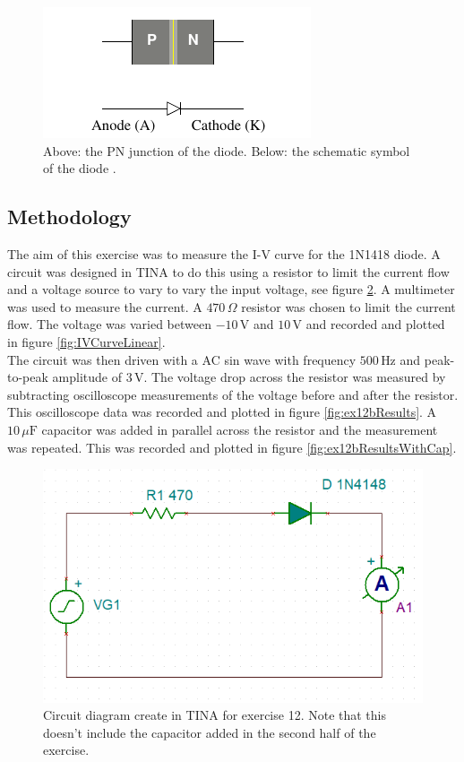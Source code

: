 \documentclass[%
reprint,
amsmath,amssymb,
aps,
floatfix
]{revtex4-2}
\begin{document}
		\begin{figure}
			\includegraphics[width=0.85\columnwidth]{pnJunction.png}
			\caption{\label{fig:pnJunction}Above: the PN junction of the diode. Below: the schematic symbol of the diode \cite{manual}.}
		\end{figure}
		
		\subsection{Methodology}
		
		The aim of this exercise was to measure the I-V curve for the 1N1418 diode. A circuit was designed in TINA to do this using a resistor to limit the current flow and a voltage source to vary to vary the input voltage, see figure \ref{fig:ex12Circuit}. A multimeter was used to measure the current. A $470 \,\Omega$ resistor was chosen to limit the current flow. The voltage was varied between $-10 \,\text{V}$ and $10 \,\text{V}$ and recorded and plotted in figure \ref{fig:IVCurveLinear}.\\
		
		The circuit was then driven with a AC sin wave with frequency $500 \,\text{Hz}$ and peak-to-peak amplitude of $3\,\text{V}$. The voltage drop across the resistor was measured by subtracting oscilloscope measurements of the voltage before and after the resistor. This oscilloscope data was recorded and plotted in figure \ref{fig:ex12bResults}. A $10 \,\mu\text{F}$ capacitor was added in parallel across the resistor and the measurement was repeated. This was recorded and plotted in figure \ref{fig:ex12bResultsWithCap}.
		
		\begin{figure}
			\includegraphics[width=0.85\columnwidth]{ex12Circuit.png}
			\caption{\label{fig:ex12Circuit}Circuit diagram create in TINA for exercise 12. Note that this doesn't include the capacitor added in the second half of the exercise.}
		\end{figure}
	
\end{document}
